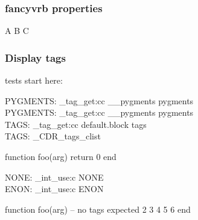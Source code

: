 \egroup

\subsubsection{\textsf{fancyvrb} properties}

\bgroup

\begin{CDRBlock} [
  pygments=false,
  tags=none,
  numbers=left,
  firstnumber=last,
]
A
B
C
\end{CDRBlock}

\newpage

\egroup

\subsubsection{Display tags}

\bgroup

tests start here:


\ExplSyntaxOn
PYGMENTS: \CDR_tag_get:cc { __pygments } { pygments } \\
\ExplSyntaxOff
{}
\ExplSyntaxOn
PYGMENTS: \CDR_tag_get:cc { __pygments } { pygments } \\
TAGS: \CDR_tag_get:cc { default.block } { tags } \\
TAGS: \g_CDR_tags_clist \\
\ExplSyntaxOff
\begin{CDRBlock}[
  stepnumber=1,
]
function foo(arg) return 0 end
\end{CDRBlock}

\ExplSyntaxOn
NONE: \CDR_int_use:c { NONE } \\
ENON: \CDR_int_use:c { ENON } \\
\ExplSyntaxOff

\begin{CDRBlock}[
  stepnumber=1,
  firstnumber = last,
]
function foo(arg) -- no tags expected
  2
  3
  4
  5
  6
end
\end{CDRBlock}

